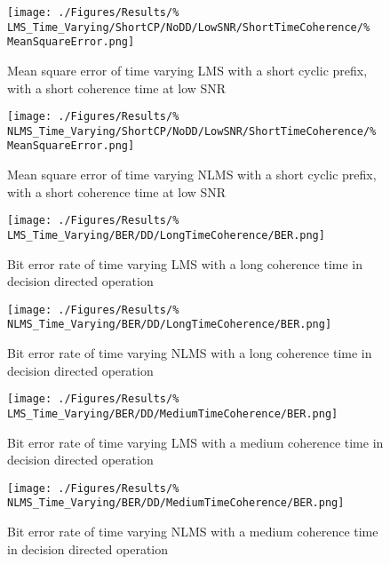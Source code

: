 \begin{figure}[ht]
	\centering
	\begin{minipage}{0.49\textwidth}
		\centering
		\texttt{[image: ./Figures/Results/\%
	LMS\_Time\_Varying/ShortCP/NoDD/LowSNR/ShortTimeCoherence/\%
	MeanSquareError.png]}
		\captionsetup{width=0.75\linewidth}
		\caption{Mean square error of time varying LMS with a 
		short cyclic prefix, with a short coherence time at 
		low SNR}
	\end{minipage}
	\begin{minipage}{0.49\textwidth}
		\centering
		\texttt{[image: ./Figures/Results/\%
	NLMS\_Time\_Varying/ShortCP/NoDD/LowSNR/ShortTimeCoherence/\%
	MeanSquareError.png]}
		\captionsetup{width=0.75\linewidth}
		\caption{Mean square error of time varying NLMS with 
		a short cyclic prefix, with a short coherence time 
		at low SNR}
	\end{minipage}
\end{figure}

\begin{figure}[ht]
	\centering
	\begin{minipage}{0.49\textwidth}
		\centering
		\texttt{[image: ./Figures/Results/\%
	LMS\_Time\_Varying/BER/DD/LongTimeCoherence/BER.png]}
		\captionsetup{width=0.75\linewidth}
		\caption{Bit error rate of time varying LMS with a 
		long coherence time in decision directed 
		operation}
	\end{minipage}
	\begin{minipage}{0.49\textwidth}
		\centering
		\texttt{[image: ./Figures/Results/\%
	NLMS\_Time\_Varying/BER/DD/LongTimeCoherence/BER.png]}
		\captionsetup{width=0.75\linewidth}
		\caption{Bit error rate of time varying NLMS with a 
		long coherence time in decision directed 
		operation}
		\label{fig:NLMS-BER-Long-DD-TV}
	\end{minipage}
\end{figure}

\begin{figure}[ht]
	\centering
	\begin{minipage}{0.49\textwidth}
		\centering
		\texttt{[image: ./Figures/Results/\%
	LMS\_Time\_Varying/BER/DD/MediumTimeCoherence/BER.png]}
		\captionsetup{width=0.75\linewidth}
		\caption{Bit error rate of time varying LMS with a 
		medium coherence time in decision directed 
		operation}
	\end{minipage}
	\begin{minipage}{0.49\textwidth}
		\centering
		\texttt{[image: ./Figures/Results/\%
	NLMS\_Time\_Varying/BER/DD/MediumTimeCoherence/BER.png]}
		\captionsetup{width=0.75\linewidth}
		\caption{Bit error rate of time varying NLMS with a 
		medium coherence time in decision directed operation}
	\end{minipage}
\end{figure}

